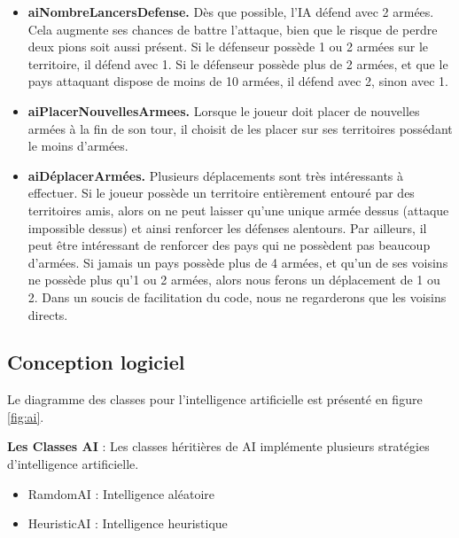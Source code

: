 \begin{itemize}
    \item \textbf{aiNombreLancersDefense.}
    Dès que possible, l'IA défend avec 2 armées. Cela augmente ses chances de battre l'attaque, bien que le risque de perdre deux pions soit aussi présent. 
    Si le défenseur possède 1 ou 2 armées sur le territoire, il défend avec 1. 
    Si le défenseur possède plus de 2 armées, et que le pays attaquant dispose de moins de 10 armées, il défend avec 2, sinon avec 1. 
    \newline
    
    \item \textbf{aiPlacerNouvellesArmees.}
    Lorsque le joueur doit placer de nouvelles armées à la fin de son tour, il choisit de les placer sur ses territoires possédant le moins d'armées.
    \newline
    
    \item \textbf{aiDéplacerArmées.}
    Plusieurs déplacements sont très intéressants à effectuer. Si le joueur possède un territoire entièrement entouré par des territoires amis, alors on ne peut laisser qu'une unique armée dessus (attaque impossible dessus) et ainsi renforcer les défenses alentours. 
    Par ailleurs, il peut être intéressant de renforcer des pays qui ne possèdent pas beaucoup d'armées. Si jamais un pays possède plus de 4 armées, et qu'un de ses voisins ne possède plus qu'1 ou 2 armées, alors nous ferons un déplacement de 1 ou 2. Dans un soucis de facilitation du code, nous ne regarderons que les voisins directs. 
    \newline
    
    
\end{itemize}

\newpage
\subsection{Conception logiciel}
Le diagramme des classes pour l’intelligence artificielle est présenté en figure \ref{fig:ai}.

\textbf{Les Classes AI} : Les classes héritières de AI implémente plusieurs stratégies d'intelligence artificielle.
\begin{itemize}
    \item RamdomAI : Intelligence aléatoire
    \item HeuristicAI : Intelligence heuristique
\end{itemize}

